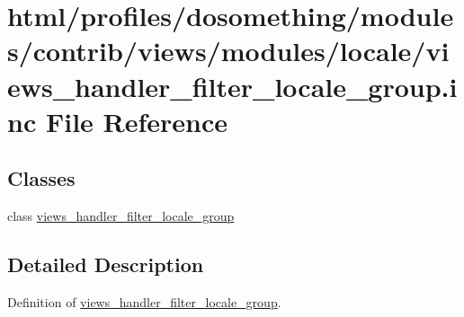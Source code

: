 \hypertarget{views__handler__filter__locale__group_8inc}{
\section{html/profiles/dosomething/modules/contrib/views/modules/locale/views\_\-handler\_\-filter\_\-locale\_\-group.inc File Reference}
\label{views__handler__filter__locale__group_8inc}
}
\subsection*{Classes}
\begin{DoxyCompactItemize}
\item 
class \hyperlink{classviews__handler__filter__locale__group}{views\_\-handler\_\-filter\_\-locale\_\-group}
\end{DoxyCompactItemize}


\subsection{Detailed Description}
Definition of \hyperlink{classviews__handler__filter__locale__group}{views\_\-handler\_\-filter\_\-locale\_\-group}. 
